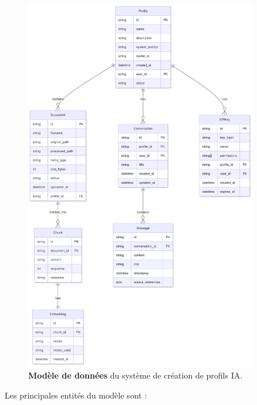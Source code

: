 \begin{figure}[H]
  \centering
  \includegraphics[width=0.9\textwidth,keepaspectratio]{pfe-pics/diagrames/modele_donnees_ia.png}
  \caption{\textbf{Modèle de données} du système de création de profils IA.}
  \label{fig:ai_data_model}
\end{figure}

Les principales entités du modèle sont :

